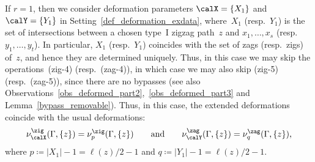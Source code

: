 \begin{Remark}\label{r=1case}
If $r=1$, then we consider deformation parameters $\calX=\{X_1\}$ and $\calY=\{Y_1\}$ in Setting~\ref{def_deformation_exdata},
where~$X_1$ (resp.~$Y_1$) is the set of intersections between a chosen type~I zigzag path~$z$ and $x_1,\dots,x_s$ (resp.\ $y_1,\dots,y_t$).
In particular, $X_1$ (resp.~$Y_1$) coincides with the set of zags (resp.~zigs) of~$z$, and hence they are determined uniquely.
Thus, in this case we may skip the operations~(zig-4) (resp.~(zag-4)), in which case we may also skip (zig-5) (resp.~(zag-5)), since there are no bypasses
(see also Observations~\ref{obs_deformed_part2},~\ref{obs_deformed_part3} and Lemma~\ref{bypass_removable}).
Thus, in this case, the extended deformations coincide with the usual deformations:
\begin{displaymath}
\nu_\calX^\zig(\Gamma,\{z\})=\nu_p^\zig(\Gamma,\{z\})\qquad \text{and} \qquad
\nu_\calY^\zag(\Gamma,\{z\})=\nu_q^\zag(\Gamma,\{z\}),
\end{displaymath}
where $p\coloneqq |X_1|-1=\ell(z)/2-1$ and $q\coloneqq |Y_1|-1=\ell(z)/2-1$.
\end{Remark}
